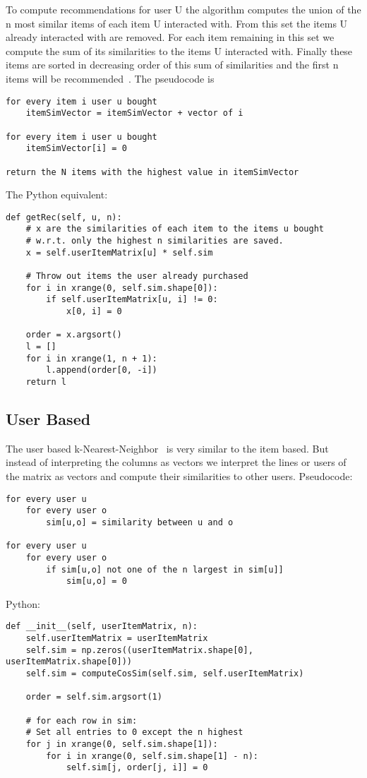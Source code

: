 To compute recommendations for user U the algorithm computes
the union of the n most similar items of each item U interacted with.
From this set the items U already interacted with are removed. For
each item remaining in this set we compute the sum of its similarities
to the items U interacted with. Finally these items are sorted in
decreasing order of this sum of similarities and the first n items
will be recommended~\cite{Karypis:2001:EIT:502585.502627}.
The pseudocode is
\begin{lstlisting}
for every item i user u bought
    itemSimVector = itemSimVector + vector of i

for every item i user u bought
    itemSimVector[i] = 0

return the N items with the highest value in itemSimVector
\end{lstlisting}
The Python equivalent:
\begin{lstlisting}
def getRec(self, u, n):
    # x are the similarities of each item to the items u bought
    # w.r.t. only the highest n similarities are saved.
    x = self.userItemMatrix[u] * self.sim

    # Throw out items the user already purchased
    for i in xrange(0, self.sim.shape[0]):
        if self.userItemMatrix[u, i] != 0:
            x[0, i] = 0

    order = x.argsort()
    l = []
    for i in xrange(1, n + 1):
        l.append(order[0, -i])
    return l
\end{lstlisting}



\subsection{User Based}

The user based k-Nearest-Neighbor~\cite{userbasedknn} is very similar to the item based.
But instead of interpreting the columns as vectors we interpret the
lines or users of the matrix as vectors and compute their similarities
to other users.
Pseudocode:
\begin{lstlisting}
for every user u
    for every user o
        sim[u,o] = similarity between u and o

for every user u
    for every user o
        if sim[u,o] not one of the n largest in sim[u]]
            sim[u,o] = 0
\end{lstlisting}
Python:
\begin{lstlisting}
def __init__(self, userItemMatrix, n):
    self.userItemMatrix = userItemMatrix
    self.sim = np.zeros((userItemMatrix.shape[0], userItemMatrix.shape[0]))
    self.sim = computeCosSim(self.sim, self.userItemMatrix)

    order = self.sim.argsort(1)

    # for each row in sim:
    # Set all entries to 0 except the n highest
    for j in xrange(0, self.sim.shape[1]):
        for i in xrange(0, self.sim.shape[1] - n):
            self.sim[j, order[j, i]] = 0
\end{lstlisting}


